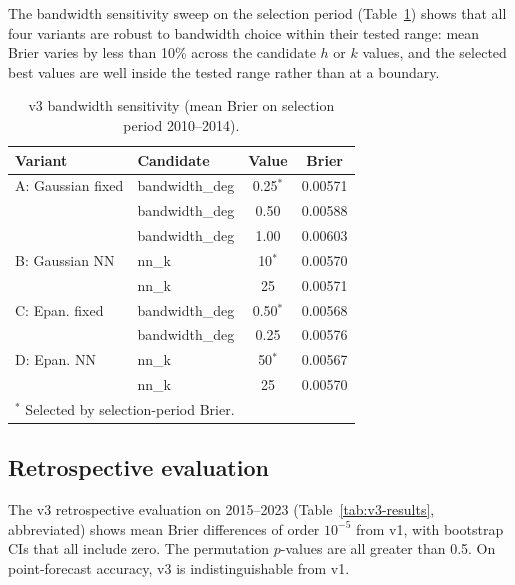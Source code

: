 \documentclass[10pt,a4paper,twocolumn]{article}
\begin{document}
The bandwidth sensitivity sweep on the selection period (Table~\ref{tab:v3-bandwidth}) shows that all four variants are robust to bandwidth choice within their tested range: mean Brier varies by less than 10\% across the candidate $h$ or $k$ values, and the selected best values are well inside the tested range rather than at a boundary.

\begin{table}[t]
\centering
\caption{v3 bandwidth sensitivity (mean Brier on selection period 2010--2014).}\label{tab:v3-bandwidth}
\small
\begin{tabular*}{\columnwidth}{@{\extracolsep{\fill}}llcc}
\toprule
Variant & Candidate & Value & Brier \\
\midrule
A: Gaussian fixed & bandwidth\_deg & 0.25$^\ast$ & 0.00571 \\
                 & bandwidth\_deg & 0.50 & 0.00588 \\
                 & bandwidth\_deg & 1.00 & 0.00603 \\
B: Gaussian NN    & nn\_k & 10$^\ast$ & 0.00570 \\
                 & nn\_k & 25 & 0.00571 \\
C: Epan. fixed    & bandwidth\_deg & 0.50$^\ast$ & 0.00568 \\
                 & bandwidth\_deg & 0.25 & 0.00576 \\
D: Epan. NN       & nn\_k & 50$^\ast$ & 0.00567 \\
                 & nn\_k & 25 & 0.00570 \\
\bottomrule
\multicolumn{4}{l}{\footnotesize $^\ast$ Selected by selection-period Brier.}
\end{tabular*}
\end{table}

\subsection{Retrospective evaluation}

The v3 retrospective evaluation on 2015--2023 (Table~\ref{tab:v3-results}, abbreviated) shows mean Brier differences of order $10^{-5}$ from v1, with bootstrap CIs that all include zero. The permutation $p$-values are all greater than 0.5. On point-forecast accuracy, v3 is indistinguishable from v1.
\end{document}
